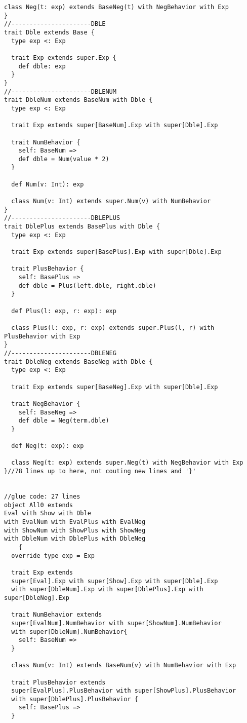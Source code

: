 \begin{lstlisting}[basicstyle=\tiny]
  class Neg(t: exp) extends BaseNeg(t) with NegBehavior with Exp
}
//----------------------DBLE
trait Dble extends Base {
  type exp <: Exp

  trait Exp extends super.Exp {
    def dble: exp
  }
}
//----------------------DBLENUM
trait DbleNum extends BaseNum with Dble {
  type exp <: Exp

  trait Exp extends super[BaseNum].Exp with super[Dble].Exp 
  
  trait NumBehavior {
    self: BaseNum =>
    def dble = Num(value * 2)
  }
  
  def Num(v: Int): exp

  class Num(v: Int) extends super.Num(v) with NumBehavior
}
//----------------------DBLEPLUS
trait DblePlus extends BasePlus with Dble {
  type exp <: Exp
  
  trait Exp extends super[BasePlus].Exp with super[Dble].Exp
  
  trait PlusBehavior {
    self: BasePlus =>
    def dble = Plus(left.dble, right.dble)
  }

  def Plus(l: exp, r: exp): exp
  
  class Plus(l: exp, r: exp) extends super.Plus(l, r) with PlusBehavior with Exp
}
//----------------------DBLENEG
trait DbleNeg extends BaseNeg with Dble {
  type exp <: Exp
  
  trait Exp extends super[BaseNeg].Exp with super[Dble].Exp

  trait NegBehavior {
    self: BaseNeg =>
    def dble = Neg(term.dble)
  }

  def Neg(t: exp): exp

  class Neg(t: exp) extends super.Neg(t) with NegBehavior with Exp
}//78 lines up to here, not couting new lines and '}'


//glue code: 27 lines
object All0 extends 
Eval with Show with Dble 
with EvalNum with EvalPlus with EvalNeg 
with ShowNum with ShowPlus with ShowNeg 
with DbleNum with DblePlus with DbleNeg 
    {
  override type exp = Exp
  
  trait Exp extends 
  super[Eval].Exp with super[Show].Exp with super[Dble].Exp
  with super[DbleNum].Exp with super[DblePlus].Exp with super[DbleNeg].Exp 

  trait NumBehavior extends
  super[EvalNum].NumBehavior with super[ShowNum].NumBehavior
  with super[DbleNum].NumBehavior{
    self: BaseNum =>
  }

  class Num(v: Int) extends BaseNum(v) with NumBehavior with Exp

  trait PlusBehavior extends
  super[EvalPlus].PlusBehavior with super[ShowPlus].PlusBehavior
  with super[DblePlus].PlusBehavior {
    self: BasePlus =>
  }


\end{lstlisting}
